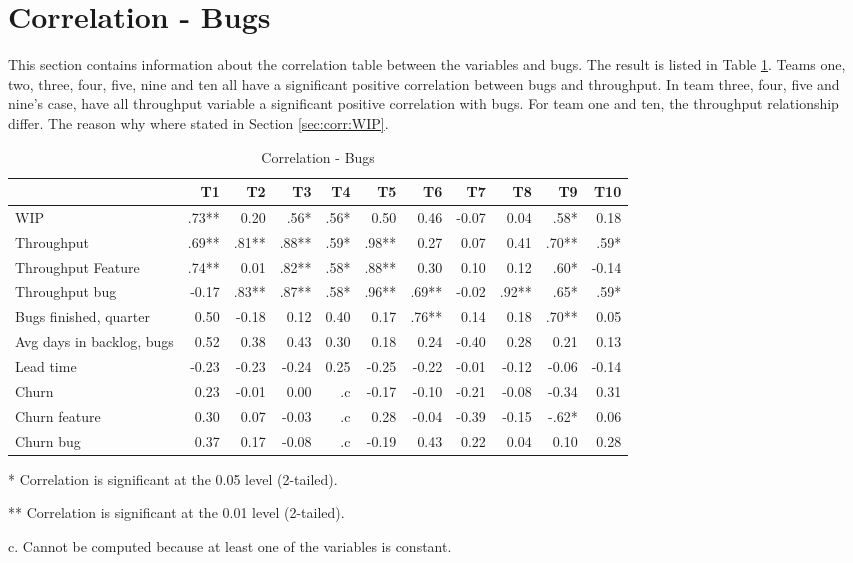 \documentclass[UKenglish]{ifimaster}  %
\begin{document}
\section{Correlation - Bugs}
\label{sec:corr:bug}
This section contains information about the correlation table between the variables and bugs. The result is listed in Table \ref{corr:bug}. Teams one, two, three, four, five, nine and ten all have a significant positive correlation between bugs and throughput. In team three, four, five and nine's case, have all throughput variable a significant positive correlation with bugs. For team one and ten, the throughput  relationship differ. The reason why where stated in Section \ref{sec:corr:WIP}. 
\begin{table}[!htbp]
 \begin{adjustwidth}{-1.5cm}{}
 \centering
 \begin{tabular}{|l|r|r|r|r|r|r|r|r|r|r|}
\hline
 & \bf{T1} & \bf{T2} & \bf{T3} & \bf{T4} & \bf{T5} & \bf{T6} & \bf{T7} & \bf{T8} & \bf{T9} & \bf{T10}\\ \hline
WIP &.73**& 0.20& .56*& .56*& 0.50& 0.46& -0.07& 0.04& .58*& 0.18\\ \hline
Throughput &.69**& .81**& .88**& .59*& .98**& 0.27& 0.07& 0.41& .70**& .59*\\ \hline
Throughput Feature &.74**& 0.01& .82**& .58*& .88**& 0.30& 0.10& 0.12& .60*& -0.14\\ \hline
Throughput bug &-0.17& .83**& .87**& .58*& .96**& .69**& -0.02& .92**& .65*& .59*\\ \hline
Bugs finished, quarter &0.50& -0.18& 0.12& 0.40& 0.17& .76**& 0.14& 0.18& .70**& 0.05\\ \hline
Avg days in backlog, bugs &0.52& 0.38& 0.43& 0.30& 0.18& 0.24& -0.40& 0.28& 0.21& 0.13\\ \hline
Lead time &-0.23& -0.23& -0.24& 0.25& -0.25& -0.22& -0.01& -0.12& -0.06& -0.14\\ \hline
Churn &0.23& -0.01& 0.00& .c& -0.17& -0.10& -0.21& -0.08& -0.34& 0.31\\ \hline
Churn feature &0.30& 0.07& -0.03& .c& 0.28& -0.04& -0.39& -0.15& -.62*& 0.06\\ \hline
Churn bug &0.37& 0.17& -0.08& .c
& -0.19& 0.43& 0.22& 0.04& 0.10& 0.28\\ \hline
\end{tabular}
 \caption{Correlation - Bugs}
 \label{corr:bug}
 \centerline {* Correlation is significant at the 0.05 level (2-tailed).}
\centerline{** Correlation is significant at the 0.01 level (2-tailed).}
\centerline{c. Cannot be computed because at least one of the variables is constant.}
\end{adjustwidth}
\end{table}
\end{document}
